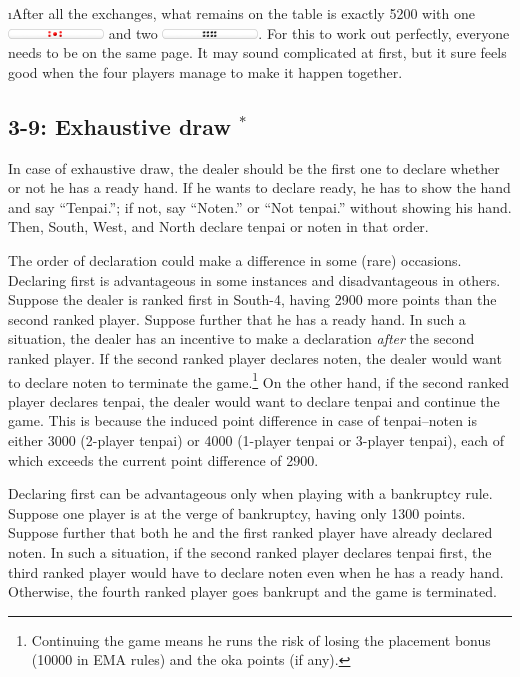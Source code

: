 \i After all the exchanges, what remains on the table is exactly 5200 with one \includegraphics[width=1in]{figs/tenbou5000} and two \includegraphics[width=1in]{figs/tenbou100}.
\ee
For this to work out perfectly, everyone needs to be on the same page. It may sound complicated at first, but it sure feels good when the four players manage to make it happen together. 

\subsection*{3-9: Exhaustive draw $^{*}$}
In case of exhaustive draw, the dealer should be the first one to declare whether or not he has a ready hand. If he wants to declare ready, he has to show the hand and say ``{\jap Tenpai}.''; if not, say ``{\jap Noten}.'' or ``Not {\jap tenpai}.'' without showing his hand. Then, South, West, and North declare {\jap tenpai} or {\jap noten} in that order. 

\bigskip
The order of declaration could make a difference in some (rare) occasions. Declaring first is advantageous in some instances and disadvantageous in others. Suppose the dealer is ranked first in South-4, having 2900 more points than the second ranked player. Suppose further that he has a ready hand. In such a situation, the dealer has an incentive to make a declaration \emph{after} the second ranked player. If the second ranked player declares {\jap noten}, the dealer would want to declare {\jap noten} to terminate the game.\footnote{Continuing the game means he runs the risk of losing the placement bonus (10000 in EMA rules) and the {\jap oka} points (if any).} On the other hand, if the second ranked player declares {\jap tenpai}, the dealer would want to declare {\jap tenpai} and continue the game. This is because the induced point difference in case of {\jap tenpai}--{\jap noten} is either 3000 (2-player {\jap tenpai}) or 4000 (1-player {\jap tenpai} or 3-player {\jap tenpai}), each of which exceeds the current point difference of 2900. 

\bigskip
Declaring first can be advantageous only when playing with a bankruptcy rule. Suppose one player is at the verge of bankruptcy, having only 1300 points. Suppose further that both he and the first ranked player have already declared {\jap noten}. 
In such a situation, if the second ranked player declares {\jap tenpai} first, the third ranked player would have to declare {\jap noten} even when he has a ready hand. Otherwise, the fourth ranked player goes bankrupt and the game is terminated.

